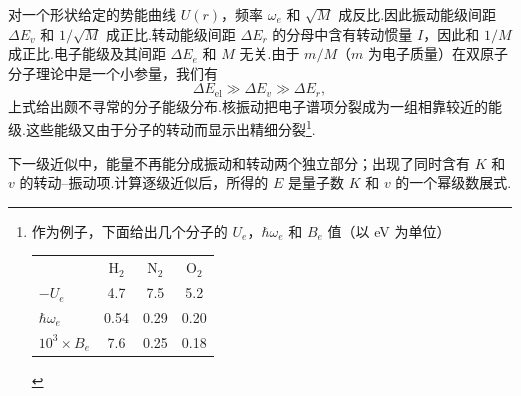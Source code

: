 对一个形状给定的势能曲线 $U(r)$，频率 $\omega_e$ 和 $\sqrt{M}$ 成反比.因此振动能级间距 $\Delta E_v$ 和 $1/\sqrt{M}$ 成正比.转动能级间距 $\Delta E_r$ 的分母中含有转动惯量 $I$，因此和 $1/M$ 成正比.电子能级及其间距 $\Delta E_e$ 和 $M$ 无关.由于 $m/M$（$m$ 为电子质量）在双原子分子理论中是一个小参量，我们有
\begin{equation}
  \Delta E_{\mathrm{el}}\gg\Delta E_v\gg\Delta E_r,
\end{equation}
上式给出颇不寻常的分子能级分布.核振动把电子谱项分裂成为一组相靠较近的能级.这些能级又由于分子的转动而显示出精细分裂\footnote{作为例子，下面给出几个分子的 $U_e$，$\hbar\omega_e$ 和 $B_e$ 值（以 eV 为单位）
\begin{center}
\begin{tabular}{lccc}
  & $\mathrm{H}_2$ & $\mathrm{N}_2$ & $\mathrm{O}_2$ \\
  $-U_e$ & 4.7 & 7.5 & 5.2 \\
  $\hbar\omega_e$ & 0.54 & 0.29 & 0.20 \\
  $10^3\times B_e$ & 7.6 & 0.25 & 0.18
\end{tabular}
\end{center}}.

下一级近似中，能量不再能分成振动和转动两个独立部分；出现了同时含有 $K$ 和 $v$ 的转动–振动项.计算逐级近似后，所得的 $E$ 是量子数 $K$ 和 $v$ 的一个幂级数展式.

